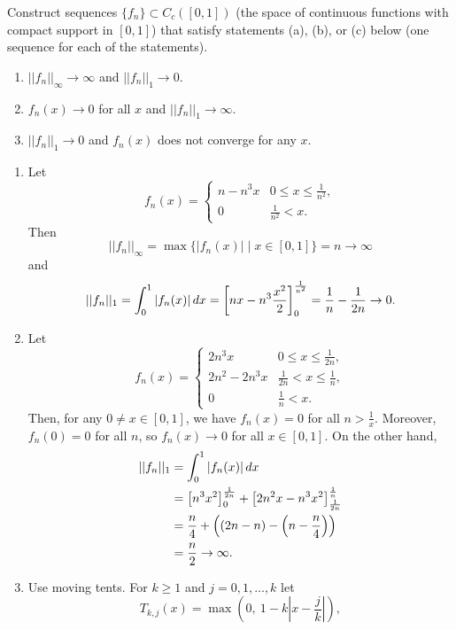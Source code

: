 \begin{problem}
Construct sequences $\{f_n\} \subset C_c([0,1])$ (the space of continuous functions with compact support in $[0,1]$) that satisfy statements (a), (b), or (c) below (one sequence for each of the statements).
\begin{enumerate}
    \item[(a)] $||f_n||_\infty \to \infty$ and $||f_n||_1 \to 0$.
    \item[(b)] $f_n(x) \to 0$ for all $x$ and $||f_n||_1 \to \infty$.
    \item[(c)] $||f_n||_1 \to 0$ and $f_n(x)$ does not converge for any $x$.
\end{enumerate}
\begin{solution}
\begin{enumerate}
    \item[(a)] Let
    $$ f_n(x) = \begin{cases}
        n - n^3 x & 0 \leq x \leq \frac{1}{n^2}, \\
        0 & \frac{1}{n^2} < x.
    \end{cases} $$
    Then
    $$ ||f_n||_\infty = \max\{|f_n(x)| \mid x \in [0,1]\} = n \to \infty $$
    and
    $$ ||f_n||_1 = \int_0^1 |f_n(x)| \,dx = \left[ nx - n^3 \frac{x^2}{2}\right]_0^{\frac{1}{n^2}} = \frac{1}{n} - \frac{1}{2n} \to 0. $$
    \item[(b)] Let
    $$ f_n(x) = \begin{cases}
        2 n^3 x & 0 \leq x \leq \frac{1}{2n}, \\
        2 n^2 - 2 n^3 x & \frac{1}{2n} < x \leq \frac{1}{n}, \\
        0 & \frac{1}{n} < x.
    \end{cases} $$
    Then, for any $0 \neq x \in [0,1]$, we have $f_n(x) = 0$ for all $n > \frac{1}{x}$. Moreover, $f_n(0) = 0$ for all $n$, so $f_n(x) \to 0$ for all $x \in [0,1]$. On the other hand,
    \begin{align*}
        ||f_n||_1 &= \int_0^1 |f_n(x)| \,dx \\
        &= \left[ n^3 x^2\right]_0^{\frac{1}{2n}} + \left[ 2 n^2 x - n^3 x^2\right]_{\frac{1}{2n}}^{\frac{1}{n}} \\
        &= \frac{n}{4} + \left( \left( 2n - n\right) - \left( n - \frac{n}{4}\right)\right) \\
        &= \frac{n}{2} \to \infty.
    \end{align*}
    \item[(c)] Use moving tents. For $k\geq 1$ and $j=0,1,\ldots,k$ let
    $$ T_{k,j}(x) = \max\left(0,\ 1-k\left|x-\frac{j}{k}\right|\right), $$

\end{enumerate}
\end{solution}
\end{problem}
